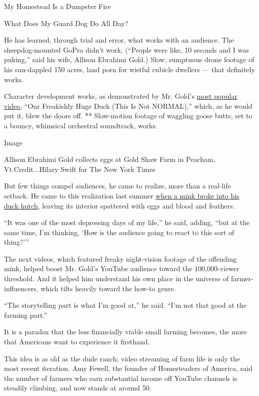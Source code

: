 My Homestead Is a Dumpster Fire

What Does My Guard Dog Do All Day?

He has learned, through trial and error, what works with an audience.
The sheepdog-mounted GoPro didn't work. (``People were like, 10 seconds
and I was puking,'' said his wife, Allison Ebrahimi Gold.) Slow,
sumptuous drone footage of his sun-dappled 150 acres, land porn for
wistful cubicle dwellers --- that definitely works.

Character development works, as demonstrated by Mr. Gold's
\href{https://www.youtube.com/watch?v=gwWKzq4WY3g}{most popular video},
``Our Freakishly Huge Duck (This Is Not NORMAL),'' which, as he would
put it, blew the doors off. ** Slow-motion footage of waggling goose
butts, set to a bouncy, whimsical orchestral soundtrack, works.

Image

Allison Ebrahimi Gold collects eggs at Gold Shaw Farm in Peacham,
Vt.Credit...Hilary Swift for The New York Times

But few things compel audiences, he came to realize, more than a
real-life setback. He came to this realization last summer
\href{https://www.youtube.com/watch?v=ym817n5S2eI\&feature=youtu.be}{when
a mink broke into his duck hutch}, leaving its interior spattered with
eggs and blood and feathers.

``It was one of the most depressing days of my life,'' he said, adding,
``but at the same time, I'm thinking, `How is the audience going to
react to this sort of thing?'''

The next videos, which featured freaky night-vision footage of the
offending mink, helped boost Mr. Gold's YouTube audience toward the
100,000-viewer threshold. And it helped him understand his own place in
the universe of farmer-influencers, which tilts heavily toward the
how-to genre.

``The storytelling part is what I'm good at,'' he said. ``I'm not that
good at the farming part.''

It is a paradox that the less financially viable small farming becomes,
the more that Americans want to experience it firsthand.

This idea is as old as the dude ranch; video streaming of farm life is
only the most recent iteration. Amy Fewell, the founder of Homesteaders
of America, said the number of farmers who earn substantial income off
YouTube channels is steadily climbing, and now stands at around 50.

